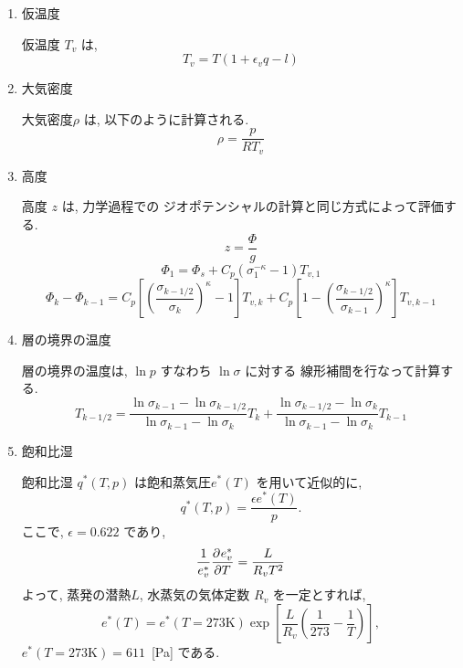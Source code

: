 \begin{enumerate}
\item 仮温度

仮温度 $T_v$ は, 
\begin{equation}
  T_v = T ( 1 + \epsilon_v q - l )
\end{equation}

\item 大気密度

大気密度$\rho$ は, 以下のように計算される.
\begin{equation}
  \rho = \frac{p}{RT_v}
\end{equation}

\item 高度

高度 $z$ は, 力学過程での
ジオポテンシャルの計算と同じ方式によって評価する.
\begin{equation}
  z = \frac{\Phi}{g} 
\end{equation}
\begin{equation}
 \Phi_{1}  =  \Phi_{s} + C_{p} ( \sigma_{1}^{-\kappa} - 1  ) T_{v,1}
\end{equation}
%
\begin{equation}
 \Phi_k - \Phi_{k-1} 
   =  C_{p}
   \left[ \left( \frac{ \sigma_{k-1/2} }{ \sigma_k } \right)^{\kappa}
          - 1 \right] T_{v,k} 
       + C_{p}
   \left[ 1- 
         \left( \frac{ \sigma_{k-1/2} }{ \sigma_{k-1} } \right)^{\kappa}
              \right] T_{v,k-1}
\end{equation}


\item 層の境界の温度

層の境界の温度は, $\ln p$ すなわち $\ln \sigma$ に対する
線形補間を行なって計算する.
\begin{equation}
  T_{k-1/2} = \frac{\ln \sigma_{k-1} - \ln \sigma_{k-1/2}}
                   {\ln \sigma_{k-1} - \ln \sigma_k      } T_k
            + \frac{\ln \sigma_{k-1/2} - \ln \sigma_k}
                   {\ln \sigma_{k-1} - \ln \sigma_k      } T_{k-1}
\end{equation}

\item 飽和比湿

飽和比湿 $q^*(T,p)$
は飽和蒸気圧$e^*(T)$ を用いて近似的に,
%
\begin{equation}
q^*(T,p) = \frac{\epsilon e^*(T)}{p} .
\end{equation}
%
ここで, $\epsilon=0.622$ であり,
%
\begin{equation}
\frac{1}{e^*_v} \DP{e^*_v}{T} = \frac{L}{R_v T^2}
\label{e-sat}
\end{equation}
%
よって, 蒸発の潜熱$L$, 水蒸気の気体定数 $R_v$ を一定とすれば,
%
\begin{equation}
  e^*(T) = e^*(T=273\mbox{K}) 
                      \exp \left[ \frac{L}{R_v} 
                            \left( \frac{1}{273} - \frac{1}{T} \right)
                       \right] ,
\end{equation}
%
$e^*(T=273\mbox{K}) = 611$\ [Pa] である.


\end{enumerate}
